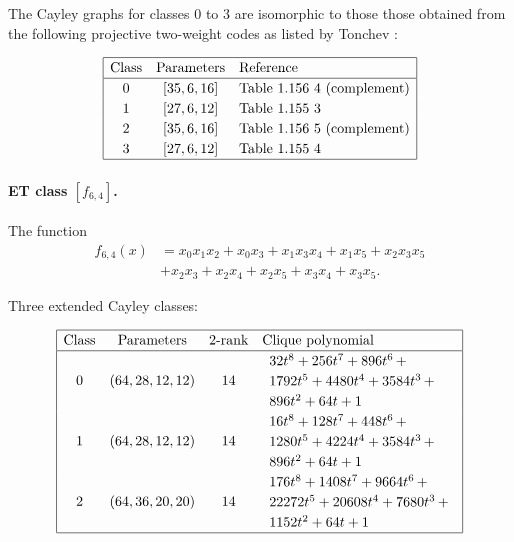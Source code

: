 \documentclass[12pt,a4paper]{article}
\begin{document}
The Cayley graphs for classes 0 to 3 are isomorphic to those those obtained from the following
projective two-weight
codes as listed by Tonchev \cite{Ton07codes}:

\begin{align*}
\def\arraystretch{1.2}
\begin{array}{|ccl|}
\hline
\text{Class} &
\text{Parameters} & \text{Reference}
\\
\hline
0 & [35,6,16] & \text{Table 1.156 4 (complement)}
\\
1 & [27,6,12] & \text{Table 1.155 3 }
\\
2 & [35,6,16] & \text{Table 1.156 5 (complement)}
\\
3 & [27,6,12] & \text{Table 1.155 4 }
\\
\hline
\end{array}
\end{align*}

\paragraph*{ET class $[f_{6,4}]$.}

The function
\begin{align*}
f_{6,4}(x) &= x_{0} x_{1} x_{2} + x_{0} x_{3} + x_{1} x_{3} x_{4} + x_{1} x_{5} + x_{2} x_{3} x_{5}
\\
           &+ x_{2} x_{3} + x_{2} x_{4} + x_{2} x_{5} + x_{3} x_{4} + x_{3} x_{5}.
\end{align*}

Three extended Cayley classes:
\small{}

\begin{align*}
\def\arraystretch{1.2}
\begin{array}{|cccl|}
\hline
\text{Class} &
\text{Parameters} &
\text{2-rank} &
\text{Clique polynomial}
\\
\hline
0 &
(64, 28, 12, 12) &
14 &
\begin{array}{l}
32t^{8} + 256t^{7} + 896t^{6}
\,+
\\
 1792t^{5} + 4480t^{4} + 3584t^{3}
\,+
\\
 896t^{2} + 64t + 1
\end{array}
\\
1 &
(64, 28, 12, 12) &
14 &
\begin{array}{l}
16t^{8} + 128t^{7} + 448t^{6}
\,+
\\
 1280t^{5} + 4224t^{4} + 3584t^{3}
\,+
\\
 896t^{2} + 64t + 1
\end{array}
\\
2 &
(64, 36, 20, 20) &
14 &
\begin{array}{l}
176t^{8} + 1408t^{7} + 9664t^{6}
\,+
\\
 22272t^{5} + 20608t^{4} + 7680t^{3}
\,+
\\
 1152t^{2} + 64t + 1
\end{array}
\\
\hline
\end{array}
\end{align*}
\end{document}
